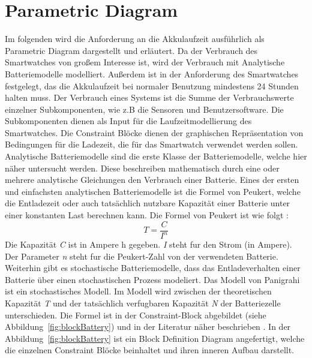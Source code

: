 \section{Parametric Diagram}
Im folgenden wird die Anforderung an die Akkulaufzeit ausführlich als Parametric Diagram dargestellt und erläutert.
Da der Verbrauch des Smartwatches von großem Interesse ist, wird der Verbrauch
mit Analytische Batteriemodelle modelliert.
Außerdem ist in der Anforderung des Smartwatches festgelegt, das die Akkulaufzeit bei normaler Benutzung mindestens 24 Stunden halten muss. %
Der Verbrauch eines Systems ist die Summe der Verbrauchswerte einzelner Subkomponenten, wie z.B die Sensoren und Benutzersoftware. Die Subkomponenten dienen als Input für die Laufzeitmodellierung des Smartwatches.
Die Constraint Blöcke dienen der graphischen Repräsentation von Bedingungen für die Ladezeit, die für das Smartwatch verwendet werden sollen.
Analytische Batteriemodelle sind die erste Klasse der Batteriemodelle, welche
hier näher untersucht werden.
Diese beschreiben mathematisch durch eine oder mehrere analytische Gleichungen den Verbrauch einer Batterie.
Eines der ersten und einfachsten analytischen Batteriemodelle ist die Formel
von Peukert, welche die Entladezeit oder auch tatsächlich nutzbare Kapazität
einer Batterie unter einer konstanten Last berechnen kann.
Die Formel von Peukert ist wie folgt \cite{peukert}:
\[
T= \frac{C}{I^{n}}
\]
Die Kapazität \textit{C} ist in Ampere h gegeben.
\textit{I} steht fur den Strom (in Ampere). Der Parameter \textit{n} steht fur die
Peukert-Zahl von der verwendeten Batterie.\\
Weiterhin gibt es stochastische Batteriemodelle, dass das Entladeverhalten einer Batterie
über einen stochastischen Prozess modeliert.
Das Modell von Panigrahi ist ein stochastisches Modell.
Im Modell wird zwischen der theoretischen Kapazität \textit{T} und der tatsächlich verfugbaren
Kapazität \textit{N} der Batteriezelle unterschieden.
Die Formel ist in der Constraint-Block abgebildet (siehe Abbildung~\ref{fig:blockBattery}) und in der Literatur näher beschrieben \cite{pan}.
In der Abbildung~\ref{fig:blockBattery} ist ein Block Definition Diagram angefertigt, welche die einzelnen Constraint Blöcke beinhaltet und ihren inneren Aufbau darstellt.

